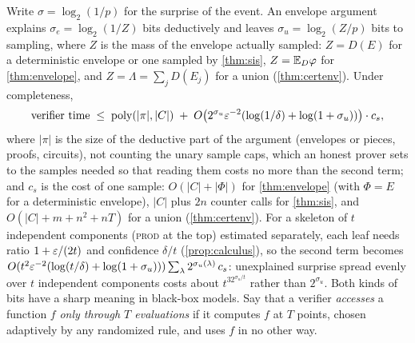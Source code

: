 Write $\sigma=\log_2(1/p)$ for the surprise of the event. An envelope argument
explains $\sigma_e=\log_2(1/Z)$ bits deductively and leaves
$\sigma_u=\log_2(Z/p)$ bits to sampling, where $Z$ is the mass of the envelope
actually sampled: $Z=D(E)$ for a deterministic envelope or one sampled by
\cref{thm:sis}, $Z=\mathbb{E}_D\varphi$ for \cref{thm:envelope}, and
$Z=\Lambda=\sum_jD(E_j)$ for a union (\cref{thm:certenv}). Under completeness,
\[
\text{verifier time}\;\le\;\mathrm{poly}(|\pi|,|C|)\;+\;O\big(2^{\sigma_u}\varepsilon^{-2}(\log(1/\delta)+\log(1+\sigma_u))\big)\cdot c_s,
\]
where $|\pi|$ is the size of the deductive part of the argument (envelopes or
pieces, proofs, circuits), not counting the unary sample caps, which an honest prover
sets to the samples needed so that reading them costs no more than the second term;
and $c_s$ is the cost of one sample: $O(|C|+|\Phi|)$ for \cref{thm:envelope} (with
$\Phi=E$ for a deterministic envelope), $|C|$ plus $2n$ counter calls for
\cref{thm:sis}, and $O(|C|+m+n^2+nT)$ for a union (\cref{thm:certenv}). For a
skeleton of $t$ independent components (\textsc{prod} at the top) estimated
separately, each leaf needs ratio $1+\varepsilon/(2t)$ and confidence $\delta/t$
(\cref{prop:calculus}), so the second term becomes
$O(t^2\varepsilon^{-2}(\log(t/\delta)+\log(1+\sigma_u)))\sum_\lambda2^{\sigma_u(\lambda)}\,c_s$:
unexplained surprise spread evenly over $t$ independent components costs about
$t^32^{\sigma_u/t}$ rather than $2^{\sigma_u}$. Both kinds of bits have a sharp
meaning in black-box models. Say that a verifier \emph{accesses} a function $f$
\emph{only through $T$ evaluations} if it computes $f$ at $T$ points, chosen
adaptively by any randomized rule, and uses $f$ in no other way.

